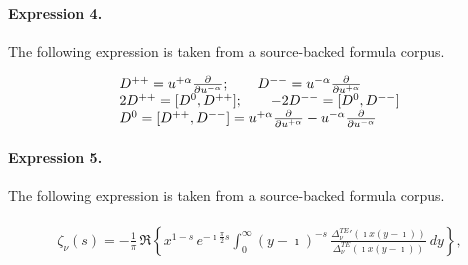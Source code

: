 \documentclass[11pt]{article}
\begin{document}
\paragraph{Expression 4.} The following expression is taken from a source-backed formula corpus.

\begin{align*}\begin{array}{lcr}D^{++}=u^{+ \alpha}{\partial\over{\partial u^{-\alpha}}};\qquad D^{--}=u^{- \alpha}{\partial\over{\partial u^{+\alpha}}}\\2D^{++}=[D^0,D^{++}];\qquad -2D^{--}=[D^0,D^{--}]\\D^0=[D^{++},D^{--}]=u^{+ \alpha}{\partial\over{\partial u^{+\alpha}}}-u^{- \alpha}{\partial\over{\partial u^{-\alpha}}}\end{array}\end{align*}

\paragraph{Expression 5.} The following expression is taken from a source-backed formula corpus.

\begin{align*}\begin{array}{c} \zeta_\nu(s)= \displaystyle{-\frac{1}{\pi}}\,\Re \left\{ x^{1-s}\, e^{\displaystyle{-\imath \frac{\pi}{2}s}} \displaystyle{\int_0^\infty} (y-\imath)^{-s}\, \displaystyle{\frac{{\Delta^{TE}_\nu}' \left(\imath x(y-\imath)\right)} {\Delta^{TE}_\nu \left(\imath x(y-\imath)\right)}} \ dy \right\},\end{array}\end{align*}
\end{document}
